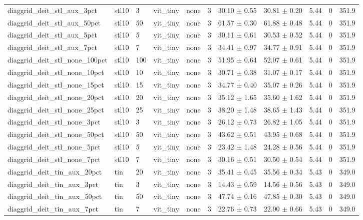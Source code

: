 \begin{tabular}{lllllllllll}
diaggrid_deit_stl_aux_3pct & stl10 & 3 & vit_tiny & none & 3 & 30.10 $\pm$ 0.55 & 30.81 $\pm$ 0.20 & 5.44 & 0 & 351.9 \\
diaggrid_deit_stl_aux_50pct & stl10 & 50 & vit_tiny & none & 3 & 61.57 $\pm$ 0.30 & 61.88 $\pm$ 0.48 & 5.44 & 0 & 351.9 \\
diaggrid_deit_stl_aux_5pct & stl10 & 5 & vit_tiny & none & 3 & 30.11 $\pm$ 0.61 & 30.53 $\pm$ 0.52 & 5.44 & 0 & 351.9 \\
diaggrid_deit_stl_aux_7pct & stl10 & 7 & vit_tiny & none & 3 & 34.41 $\pm$ 0.97 & 34.77 $\pm$ 0.91 & 5.44 & 0 & 351.9 \\
diaggrid_deit_stl_none_100pct & stl10 & 100 & vit_tiny & none & 3 & 51.95 $\pm$ 0.64 & 52.07 $\pm$ 0.61 & 5.44 & 0 & 351.9 \\
diaggrid_deit_stl_none_10pct & stl10 & 10 & vit_tiny & none & 3 & 30.71 $\pm$ 0.38 & 31.07 $\pm$ 0.17 & 5.44 & 0 & 351.9 \\
diaggrid_deit_stl_none_15pct & stl10 & 15 & vit_tiny & none & 3 & 34.77 $\pm$ 0.40 & 35.07 $\pm$ 0.26 & 5.44 & 0 & 351.9 \\
diaggrid_deit_stl_none_20pct & stl10 & 20 & vit_tiny & none & 3 & 35.12 $\pm$ 1.65 & 35.60 $\pm$ 1.62 & 5.44 & 0 & 351.9 \\
diaggrid_deit_stl_none_25pct & stl10 & 25 & vit_tiny & none & 3 & 38.20 $\pm$ 1.48 & 38.65 $\pm$ 1.43 & 5.44 & 0 & 351.9 \\
diaggrid_deit_stl_none_3pct & stl10 & 3 & vit_tiny & none & 3 & 26.12 $\pm$ 0.73 & 26.82 $\pm$ 1.05 & 5.44 & 0 & 351.9 \\
diaggrid_deit_stl_none_50pct & stl10 & 50 & vit_tiny & none & 3 & 43.62 $\pm$ 0.51 & 43.95 $\pm$ 0.68 & 5.44 & 0 & 351.9 \\
diaggrid_deit_stl_none_5pct & stl10 & 5 & vit_tiny & none & 3 & 23.42 $\pm$ 1.48 & 24.28 $\pm$ 0.56 & 5.44 & 0 & 351.9 \\
diaggrid_deit_stl_none_7pct & stl10 & 7 & vit_tiny & none & 3 & 30.16 $\pm$ 0.51 & 30.50 $\pm$ 0.54 & 5.44 & 0 & 351.9 \\
diaggrid_deit_tin_aux_20pct & tin & 20 & vit_tiny & none & 3 & 35.41 $\pm$ 0.45 & 35.56 $\pm$ 0.34 & 5.43 & 0 & 349.0 \\
diaggrid_deit_tin_aux_3pct & tin & 3 & vit_tiny & none & 3 & 14.43 $\pm$ 0.59 & 14.56 $\pm$ 0.56 & 5.43 & 0 & 349.0 \\
diaggrid_deit_tin_aux_50pct & tin & 50 & vit_tiny & none & 3 & 47.74 $\pm$ 0.16 & 47.85 $\pm$ 0.30 & 5.43 & 0 & 349.0 \\
diaggrid_deit_tin_aux_7pct & tin & 7 & vit_tiny & none & 3 & 22.76 $\pm$ 0.73 & 22.90 $\pm$ 0.66 & 5.43 & 0 & 349.0 \\

\end{tabular}
